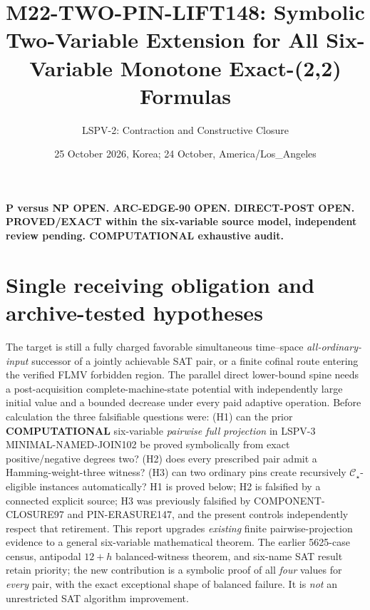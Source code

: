 \documentclass[11pt]{article}
\title{M22-TWO-PIN-LIFT148: Symbolic Two-Variable Extension for All Six-Variable Monotone Exact-(2,2) Formulas}
\author{LSPV-2: Contraction and Constructive Closure}
\date{25 October 2026, Korea; 24 October, America/Los\_Angeles}
\newcommand{\CS}{\mathcal C_{\star}}
\begin{document}
\maketitle
\begin{center}
\textbf{P versus NP OPEN. ARC-EDGE-90 OPEN. DIRECT-POST OPEN.}\\
\textbf{PROVED/EXACT within the six-variable source model, independent review pending. COMPUTATIONAL exhaustive audit.}
\end{center}
\section{Single receiving obligation and archive-tested hypotheses}
The target is still a fully charged favorable simultaneous time--space \emph{all-ordinary-input} successor of a jointly achievable SAT pair, or a finite cofinal route entering the verified FLMV forbidden region. The parallel direct lower-bound spine needs a post-acquisition complete-machine-state potential with independently large initial value and a bounded decrease under every paid adaptive operation.
Before calculation the three falsifiable questions were: (H1) can the prior \textbf{COMPUTATIONAL} six-variable \emph{pairwise full projection} in LSPV-3 MINIMAL-NAMED-JOIN102 be proved symbolically from exact positive/negative degrees two? (H2) does every prescribed pair admit a Hamming-weight-three witness? (H3) can two ordinary pins create recursively \(\CS\)-eligible instances automatically? H1 is proved below; H2 is falsified by a connected explicit source; H3 was previously falsified by COMPONENT-CLOSURE97 and PIN-ERASURE147, and the present controls independently respect that retirement.
This report upgrades \emph{existing} finite pairwise-projection evidence to a general six-variable mathematical theorem. The earlier 5625-case census, antipodal \(12+h\) balanced-witness theorem, and six-name SAT result retain priority; the new contribution is a symbolic proof of all \emph{four} values for \emph{every} pair, with the exact exceptional shape of balanced failure. It is \emph{not} an unrestricted SAT algorithm improvement.
\end{document}
